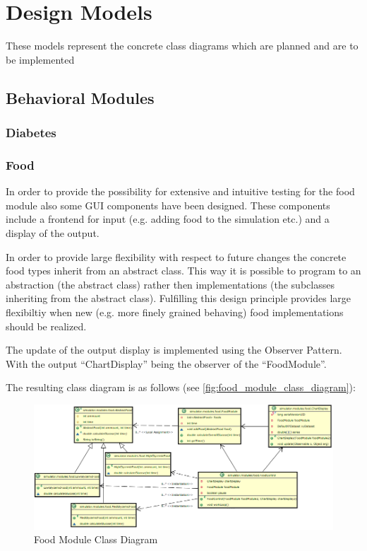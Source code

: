 \section{Design Models}
These models represent the concrete class diagrams which are planned and are to
be implemented

\subsection{Behavioral Modules}

\subsubsection{Diabetes}

\subsubsection{Food}
In order to provide the possibility for extensive and intuitive testing for the
food module also some GUI components have been designed.
These components include a frontend for input (e.g. adding food to the
simulation etc.) and a display of the output.

In order to provide large flexibility with respect to future changes the
concrete food types inherit from an abstract class. This way it is possible to
program to an abstraction (the abstract class) rather then implementations (the
subclasses inheriting from the abstract class).
Fulfilling this design principle provides large flexibiltiy when new (e.g. more
finely grained behaving) food implementations should be realized.

The update of the output display is implemented using the Observer Pattern.
With the output ``ChartDisplay'' being the observer of the ``FoodModule''.

The resulting class diagram is as follows (see
\vref{fig:food_module_class_diagram}):

\begin{figure}[htb]
\centering
\includegraphics[width=\textwidth]{images/food_module_class_diagram2.png}
\caption{Food Module Class Diagram}
\label{fig:food_module_class_diagram}
\end{figure}

